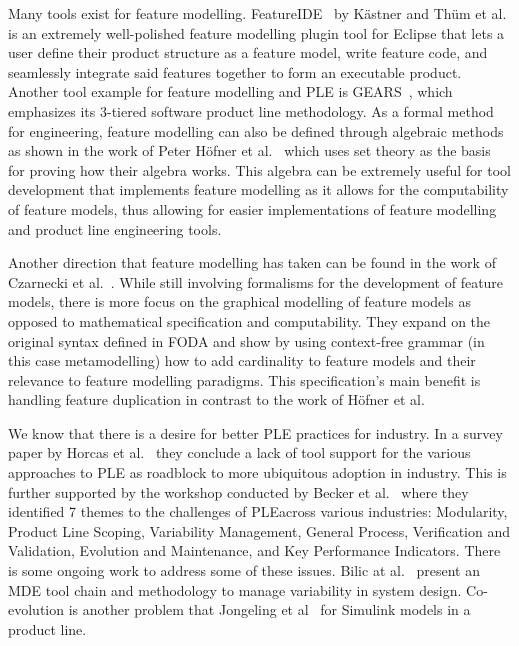 Many tools exist for feature modelling. FeatureIDE~\cite{kastner2009featureide, thum2014featureide} by K\"{a}stner and Th{\"u}m et al. is an extremely well-polished feature modelling plugin tool for Eclipse that lets a user define their product structure as a feature model, write feature code, and seamlessly integrate said features together to form an executable product. Another tool example for feature modelling and PLE is GEARS~\cite{GEARS}, which emphasizes its 3-tiered software product line methodology. As a formal method for engineering, feature modelling can also be defined through algebraic methods as shown in the work of Peter H\"{o}fner et al.~\cite{hofner2006feature,hofner2011algebra} which uses set theory as the basis for proving how their algebra works. This algebra can be extremely useful for tool development that implements feature modelling as it allows for the computability of feature models, thus allowing for easier implementations of feature modelling and product line engineering tools.

Another direction that feature modelling has taken can be found in the work of Czarnecki et al.~\cite{czarnecki2004staged}. While still involving formalisms for the development of feature models, there is more focus on the graphical modelling of feature models as opposed to mathematical specification and computability. They expand on the original syntax defined in FODA and show by using context-free grammar (in this case metamodelling) how to add cardinality to feature models and their relevance to feature modelling paradigms. This specification's main benefit is handling feature duplication in contrast to the work of H\"{o}fner et al.

We know that there is a desire for better \ac{PLE} practices for industry. In a survey paper by Horcas et al.~\cite{horcas2019software} they conclude a lack of tool support for the various approaches to \ac{PLE} as roadblock to more ubiquitous adoption in industry. This is further supported by the workshop conducted by Becker et al.~\cite{becker2024not} where they identified 7 themes to the challenges of \ac{PLE}across various industries: Modularity, Product Line Scoping, Variability Management, General Process, Verification and Validation, Evolution and Maintenance, and Key Performance Indicators. There is some ongoing work to address some of these issues. Bilic at al.~\cite{bilic2019integrated} present an \ac{MDE} tool chain and methodology to manage variability in system design. Co-evolution is another problem that Jongeling et al~\cite{jongeling2020co} for Simulink models in a product line. 

